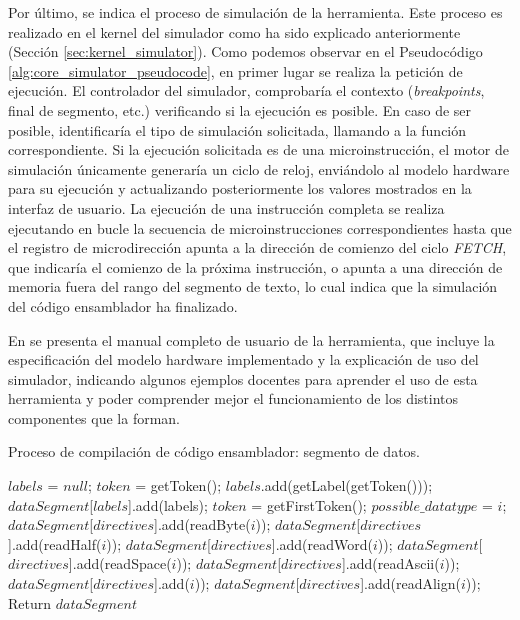 Por último, se indica el proceso de simulación de la herramienta. Este proceso es realizado en el kernel del simulador como ha sido explicado anteriormente (Sección \ref{sec:kernel_simulator}). Como podemos observar en el Pseudocódigo \ref{alg:core_simulator_pseudocode}, en primer lugar se realiza la petición de ejecución. El controlador del simulador, comprobaría el contexto (\textit{breakpoints}, final de segmento, etc.) verificando si la ejecución es posible. En caso de ser posible, identificaría el tipo de simulación solicitada, llamando a la función correspondiente. Si la ejecución solicitada es de una microinstrucción, el motor de simulación únicamente generaría un ciclo de reloj, enviándolo al modelo hardware para su ejecución y actualizando posteriormente los valores mostrados en la interfaz de usuario. La ejecución de una instrucción completa se realiza ejecutando en bucle la secuencia de microinstrucciones correspondientes hasta que el registro de microdirección apunta a la dirección de comienzo del ciclo \textit{FETCH}, que indicaría el comienzo de la próxima instrucción, o apunta a una dirección de memoria fuera del rango del segmento de texto, lo cual indica que la simulación del código ensamblador ha finalizado.

En \cite{wepsimManualUser} se presenta el manual completo de usuario de la herramienta, que incluye la especificación del modelo hardware implementado y la explicación de uso del simulador, indicando algunos ejemplos docentes para aprender el uso de esta herramienta y poder comprender mejor el funcionamiento de los distintos componentes que la forman.

\begin{algorithm}[h]
	\caption{Proceso de compilación de código ensamblador: segmento de datos.}
	\label{alg:data_segment_pseudocode}
  	\scriptsize
	\begin{algorithmic}[1]
			\State $labels$ = $null$;		
			\State $token$ = getToken();
			   
					\State $labels$.add(getLabel(getToken()));
				\EndIf
			\EndWhile
			\State $dataSegment$[$labels$].add(labels);
			\State $token$ = getFirstToken();
				  
				\State $possible\_datatype$ = $i$;
					$dataSegment$[$directives$].add(readByte($i$));
				\EndIf
					$dataSegment$[$directives$].add(readHalf($i$));
				\EndIf
					$dataSegment$[$directives$].add(readWord($i$));
				\EndIf
					$dataSegment$[$directives$].add(readSpace($i$));
				\EndIf
					$dataSegment$[$directives$].add(readAscii($i$));
				\EndIf
					$dataSegment$[$directives$].add($i$));
				\EndIf
					$dataSegment$[$directives$].add(readAlign($i$));
				\EndIf
			\EndFor
			 \State Return $dataSegment$
		\EndFunction
	\end{algorithmic}
\end{algorithm}

